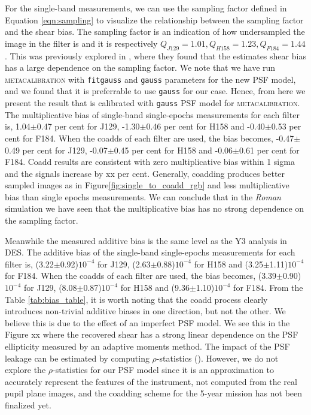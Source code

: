 \documentclass[fleqn,usenatbib]{mnras}
\begin{document}
For the single-band measurements, we can use the sampling factor defined in Equation \ref{eqn:sampling} to visualize the relationship between the sampling factor and the shear bias. The sampling factor is an indication of how undersampled the image in the filter is and it is respectively $Q_{J129}=1.01, Q_{H158}=1.23, Q_{F184}=1.44$. This was previously explored in \citealt{2021MNRAS.502.4048K}, where they found that the estimates shear bias has a large dependence on the sampling factor. We note that we have run \textsc{metacalibration} with \texttt{fitgauss} and \texttt{gauss} parameters for the new PSF model, and we found that it is preferrable to use \texttt{gauss} for our case. Hence, from here we present the result that is calibrated with \texttt{gauss} PSF model for \textsc{metacalibration}. The multiplicative bias of single-band single-epochs measurements for each filter is, 1.04$\pm$0.47 per cent for J129, -1.30$\pm$0.46 per cent for H158 and -0.40$\pm$0.53 per cent for F184. When the coadds of each filter are used, the bias becomes, -0.47$\pm$0.49 per cent for J129, -0.07$\pm$0.45 per cent for H158 and -0.06$\pm$0.61 per cent for F184. Coadd results are consistent with zero multiplicative bias within 1 sigma and the signals increase by xx per cent. Generally, coadding produces better sampled images as in Figure\ref{fig:single_to_coadd_rgb} and less multiplicative bias than single epochs measurements. We can conclude that in the \emph{Roman} simulation we have seen that the multiplicative bias has no strong dependence on the sampling factor.


Meanwhile the measured additive bias is the same level as the Y3 analysis in DES. The additive bias of the single-band single-epochs measurements for each filter is, (3.22$\pm$0.92)$10^{-4}$ for J129, (2.63$\pm$0.88)$10^{-4}$ for H158 and (3.25$\pm$1.11)$10^{-4}$ for F184. When the coadds of each filter are used, the bias becomes, (3.39$\pm$0.90)$10^{-4}$ for J129, (8.08$\pm$0.87)$10^{-4}$ for H158 and (9.36$\pm$1.10)$10^{-4}$ for F184. From the Table \ref{tab:bias_table}, it is worth noting that the coadd process clearly introduces non-trivial additive biases in one direction, but not the other. We believe this is due to the effect of an imperfect PSF model. We see this in the Figure xx where the recovered shear has a strong linear dependence on the PSF ellipticity measured by an adaptive moments method. The impact of the PSF leakage can be estimated by computing $\rho$-statistics (\citealt{2008A&A...484...67P, 2010MNRAS.404..350R, 2016MNRAS.460.2245J}). However, we do not explore the $\rho$-statistics for our PSF model since it is an approximation to accurately represent the features of the instrument, not computed from the real pupil plane images, and the coadding scheme for the 5-year mission has not been finalized yet. 
\end{document}
